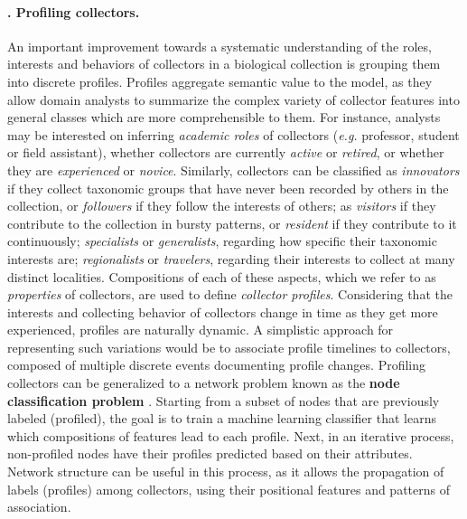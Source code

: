\paragraph*{\theApplicationCase. Profiling collectors.}
An important improvement towards a systematic understanding of the roles, interests and behaviors of collectors in a biological collection is grouping them into discrete profiles.
Profiles aggregate semantic value to the model, as they allow domain analysts to summarize the complex variety of collector features into general classes which are more comprehensible to them.
%
For instance, analysts may be interested on inferring \textit{academic roles} of collectors (\textit{e.g.} professor, student or field assistant), whether collectors are currently \textit{active} or \textit{retired}, or whether they are \textit{experienced} or \textit{novice}.
Similarly, collectors can be classified as \textit{innovators} if they collect taxonomic groups that have never been recorded by others in the collection, or \textit{followers} if they follow the interests of others;
as \textit{visitors} if they contribute to the collection in bursty patterns, or \textit{resident} if they contribute to it continuously;
\textit{specialists} or \textit{generalists}, regarding how specific their taxonomic interests are;
\textit{regionalists} or \textit{travelers}, regarding their interests to collect at many distinct localities.
Compositions of each of these aspects, which we refer to as \textit{properties} of collectors, are used to define \textit{collector profiles}.
Considering that the interests and collecting behavior of collectors change in time as they get more experienced, profiles are naturally dynamic.
A simplistic approach for representing such variations would be to associate profile timelines to collectors, composed of multiple discrete events documenting profile changes.
%
Profiling collectors can be generalized to a network problem known as the \textbf{node classification problem} \cite{Bhagat2011}.
Starting from a subset of nodes that are previously labeled (profiled), the goal is to train a machine learning classifier that learns which compositions of features lead to each profile.
Next, in an iterative process, non-profiled nodes have their profiles predicted based on their attributes.
Network structure can be useful in this process, as it allows the propagation of labels (profiles) among collectors, using their positional features and patterns of association.


